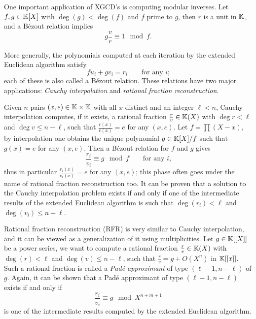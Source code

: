 One important application of XGCD's is computing modular inverses. Let
$f,g\in\mathbb{K}[X]$ with $\deg(g)<\deg(f)$ and $f$ prime to $g$, then $r$ is
a unit in $\mathbb{K}$, and a Bézout relation implies
\begin{equation}
  \label{eq:206}
  g\frac{v}{r} \equiv 1 \mod f
  \text{.}
\end{equation}

More generally, the polynomials computed at each iteration by the
extended Euclidean algorithm satisfy
\begin{equation}
  \label{eq:156}
  fu_i + gv_i =  r_i
  \qquad\text{for any $i$;}
\end{equation}
each of these is also called a Bézout relation. These relations have
two major applications: \textit{Cauchy interpolation} and \textit{rational
  fraction reconstruction}.

Given $n$ pairs $(x,e)\in\mathbb{K}\times\mathbb{K}$ with all $x$ distinct and an
integer $\ell<n$, Cauchy interpolation
computes, if it exists, a rational fraction $\frac{r}{v}\in\mathbb{K}(X)$ with
$\deg r<\ell$ and $\deg v \le n-\ell$, such that $\frac{r(x)}{v(x)}=e$
for any $(x,e)$. Let $f=\prod (X-x)$, by interpolation one obtains the
unique polynomial $g\in\mathbb{K}[X]/f$ such that $g(x)=e$ for any
$(x,e)$. Then a Bézout relation for $f$ and $g$ gives
\begin{equation}
  \label{eq:207}
  \frac{r_i}{v_i} \equiv g \mod f
  \qquad\text{for any $i$,}
\end{equation}
thus in particular $\frac{r_i(x)}{v_i(x)}=e$ for any $(x,e)$; this
phase often goes under the name of rational fraction reconstruction
too. It can be proven that a solution to the Cauchy interpolation
problem exists if and only if one of the intermediate results of the
extended Euclidean algorithm is such that $\deg(r_i)<\ell$ and
$\deg(v_i)\le n-\ell$.

Rational fraction
reconstruction (RFR) is very similar to Cauchy
interpolation, and it can be viewed as a generalization of it using
multiplicities. Let $g\in\mathbb{K}[[X]]$ be a power series, we want to
compute a rational fraction $\frac{r}{v}\in\mathbb{K}(X)$ with $\deg(r)<\ell$
and $\deg(v)\le n-\ell$, such that $\frac{r}{v}=g+O(X^n)$ in
$\mathbb{K}[[x]]$. Such a rational fraction is called a
\textit{Padé approximant} of type
$(\ell-1,n-\ell)$ of $g$. Again, it can be shown that a Padé
approximant of type $(\ell-1,n-\ell)$ exists if and only if
\begin{equation}
  \label{eq:210}
  \frac{r_i}{v_i}\equiv g \mod X^{n+m+1}
\end{equation}
is one of the intermediate results computed by the extended Euclidean
algorithm.


